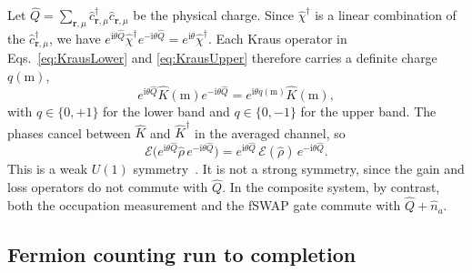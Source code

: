 \documentclass[aps,prb,10pt,twocolumn,superscriptaddress,longbibliography,floatfix]{revtex4-2}
\newcommand{\ii}{\mathrm{i}}
\newcommand{\mc}[1]{\mathcal{#1}}
\newcommand{\bfr}{\boldsymbol r}
\begin{document}
Let $\hat Q=\sum_{\bfr,\mu}\hat c^\dagger_{\bfr,\mu}\hat c_{\bfr,\mu}$ be the physical charge. Since $\hat\chi^\dagger$ is a linear combination of the $\hat c^\dagger_{\bfr,\mu}$, we have $e^{\ii\theta\hat Q}\hat\chi^\dagger e^{-\ii\theta\hat Q}=e^{\ii\theta}\hat\chi^\dagger$. Each Kraus operator in Eqs.~\eqref{eq:KrausLower} and \eqref{eq:KrausUpper} therefore carries a definite charge $q(\mathrm{m})$,
\begin{equation}
    e^{\ii\theta\hat Q}\hat K(\mathrm{m})e^{-\ii\theta\hat Q}=e^{\ii\theta q(\mathrm{m})}\hat K(\mathrm{m}),
    \label{eq:KrausCharge}
\end{equation}
with $q\in\{0,+1\}$ for the lower band and $q\in\{0,-1\}$ for the upper band. The phases cancel between $\hat K$ and $\hat K^\dagger$ in the averaged channel, so
\begin{equation}
    \mc E\big(e^{\ii\theta\hat Q}\hat\rho\,e^{-\ii\theta\hat Q}\big)=e^{\ii\theta\hat Q}\,\mc E(\hat\rho)\,e^{-\ii\theta\hat Q}.
    \label{eq:WeakU1}
\end{equation}
This is a weak $U(1)$ symmetry~\cite{BucaProsen2012,AlbertJiang2014}. It is not a strong symmetry, since the gain and loss operators do not commute with $\hat Q$. In the composite system, by contrast, both the occupation measurement and the fSWAP gate commute with $\hat Q+\hat n_a$.

\subsection{Fermion counting run to completion}
\end{document}
